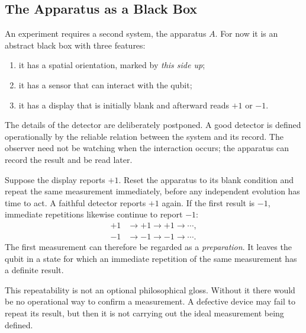 \begin{classroomqa}
\end{classroomqa}

\subsection{The Apparatus as a Black Box}

An experiment requires a second system, the apparatus \(A\). For now it is an abstract black box with three features:
\begin{enumerate}
  \item it has a spatial orientation, marked by \emph{this side up};
  \item it has a sensor that can interact with the qubit;
  \item it has a display that is initially blank and afterward reads \(+1\) or \(-1\).
\end{enumerate}
The details of the detector are deliberately postponed. A good detector is defined operationally by the reliable relation between the system and its record. The observer need not be watching when the interaction occurs; the apparatus can record the result and be read later.

Suppose the display reports \(+1\). Reset the apparatus to its blank condition and repeat the same measurement immediately, before any independent evolution has time to act. A faithful detector reports \(+1\) again. If the first result is \(-1\), immediate repetitions likewise continue to report \(-1\):
\begin{equation}
\begin{aligned}
  +1&\longrightarrow +1\longrightarrow +1\longrightarrow\cdots,\\
  -1&\longrightarrow -1\longrightarrow -1\longrightarrow\cdots.
\end{aligned}
\end{equation}
The first measurement can therefore be regarded as a \emph{preparation}. It leaves the qubit in a state for which an immediate repetition of the same measurement has a definite result.

This repeatability is not an optional philosophical gloss. Without it there would be no operational way to confirm a measurement. A defective device may fail to repeat its result, but then it is not carrying out the ideal measurement being defined.

